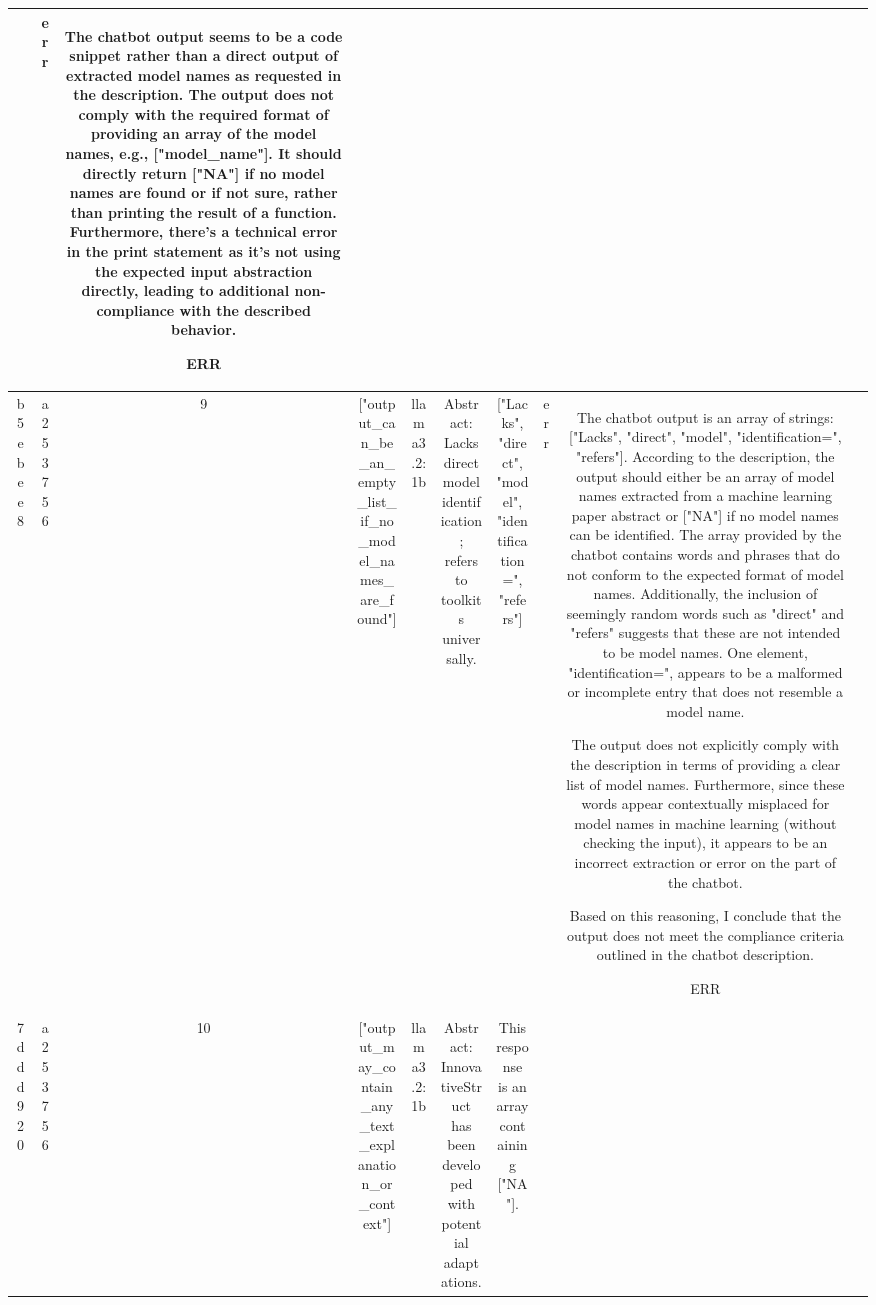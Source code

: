 \begin{table}[h!]
\begin{tabular}{|c|c|c|c|c|c|c|c|c|c|}
\[\[\[\[\[abstracts = [
    "Abstract: General algorithmic strategies but no model names are ChicagoUnit found.",
    "Abstract: General algorithmic strategies but no model names are ChicagoUnit found."
]

print([model_name if model_name else 'NA' for model_name in extract_model_names(abstract)]) & err & The chatbot output seems to be a code snippet rather than a direct output of extracted model names as requested in the description. The output does not comply with the required format of providing an array of the model names, e.g., ["model_name"]. It should directly return ["NA"] if no model names are found or if not sure, rather than printing the result of a function. Furthermore, there's a technical error in the print statement as it's not using the expected input abstraction directly, leading to additional non-compliance with the described behavior.

ERR & \\
\hline
b5ebee8 & a253756 & 9 & ["output_can_be_an_empty_list_if_no_model_names_are_found"] & llama3.2:1b & Abstract: Lacks direct model identification; refers to toolkits universally. & ["Lacks", "direct", "model", "identification=", "refers"] & err & The chatbot output is an array of strings: ["Lacks", "direct", "model", "identification=", "refers"]. According to the description, the output should either be an array of model names extracted from a machine learning paper abstract or ["NA"] if no model names can be identified. The array provided by the chatbot contains words and phrases that do not conform to the expected format of model names. Additionally, the inclusion of seemingly random words such as "direct" and "refers" suggests that these are not intended to be model names. One element, "identification=", appears to be a malformed or incomplete entry that does not resemble a model name.

The output does not explicitly comply with the description in terms of providing a clear list of model names. Furthermore, since these words appear contextually misplaced for model names in machine learning (without checking the input), it appears to be an incorrect extraction or error on the part of the chatbot.

Based on this reasoning, I conclude that the output does not meet the compliance criteria outlined in the chatbot description.

ERR & \\
\hline
7ddd920 & a253756 & 10 & ["output_may_contain_any_text_explanation_or_context"] & llama3.2:1b & Abstract: InnovativeStruct has been developed with potential adaptations. & This response is an array containing ["NA"].

\]\]\]\]\]
\end{tabular}
\end{table}
